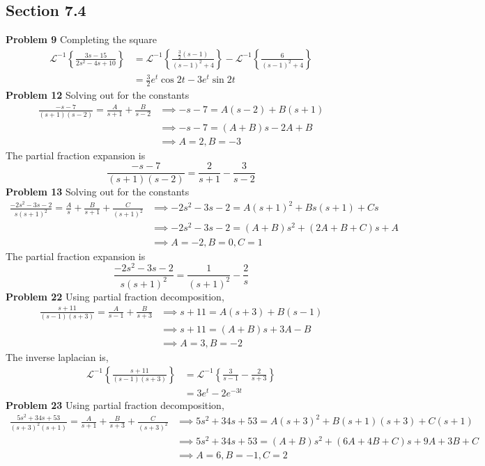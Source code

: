 \subsection*{Section 7.4}
\newcommand{\invLap}[1]{\mathscr{L}^{-1} \left\{ #1 \right\}}
\textbf{Problem 9}
    Completing the square
    \begin{align*}
        \invLap{\frac{3s-15}{2s^2-4s+10}}
        &= \invLap{\frac{\frac{3}{2}(s-1)}{(s-1)^2+4}} - \invLap{\frac{6}{(s-1)^2+4}} \\
        &= \frac{3}{2}e^t\cos 2t - 3e^t\sin 2t
    \end{align*}
\textbf{Problem 12}
    Solving out for the constants
    \begin{align*}
        \frac{-s-7}{(s+1)(s-2)} = \frac{A}{s+1} + \frac{B}{s-2}
        &\implies -s-7 = A(s-2) + B(s+1) \\
        &\implies -s-7 = (A+B)s - 2A + B \\
        &\implies A=2, B=-3
    \end{align*}
    The partial fraction expansion is 
    \[
        \frac{-s-7}{(s+1)(s-2)} = \frac{2}{s+1} - \frac{3}{s-2}
    \]
\textbf{Problem 13}
    Solving out for the constants
    \begin{align*}
        \frac{-2s^2-3s-2}{s(s+1)^2} = \frac{A}{s} + \frac{B}{s+1} + \frac{C}{(s+1)^2}
        &\implies -2s^2-3s-2 = A(s+1)^2 + Bs(s+1) +Cs \\
        &\implies -2s^2-3s-2 = (A+B)s^2+ (2A+B+C)s + A\\
        &\implies A=-2, B=0, C=1
    \end{align*}
    The partial fraction expansion is
    \[
        \frac{-2s^2-3s-2}{s(s+1)^2} 
        = \frac{1}{(s+1)^2} -\frac{2}{s}
    \]
\textbf{Problem 22}
    Using partial fraction decomposition,
    \begin{align*}
        \frac{s+11}{(s-1)(s+3)} = \frac{A}{s-1} + \frac{B}{s+3} 
        &\implies s+11 = A(s+3) + B(s-1) \\
        &\implies s+11 = (A+B)s + 3A - B \\
        &\implies A = 3, B= -2
    \end{align*}
    The inverse laplacian is,
    \begin{align*}
        \invLap{\frac{s+11}{(s-1)(s+3)}}
        &= \invLap{\frac{3}{s-1} - \frac{2}{s+3}} \\
        &= 3e^t - 2e^{-3t}
    \end{align*}
\textbf{Problem 23}
    Using partial fraction decomposition,
    \begin{align*}
        \frac{5s^2+34s+53}{(s+3)^2(s+1)} = \frac{A}{s+1} + \frac{B}{s+3} + \frac{C}{(s+3)^2}
        &\implies 5s^2+34s+53 = A(s+3)^2 + B(s+1)(s+3) + C(s+1) \\
        &\implies 5s^2+34s+53 = (A+B)s^2 + (6A+4B+C)s + 9A+3B+C \\
        &\implies A = 6, B = -1, C = 2
    \end{align*}
